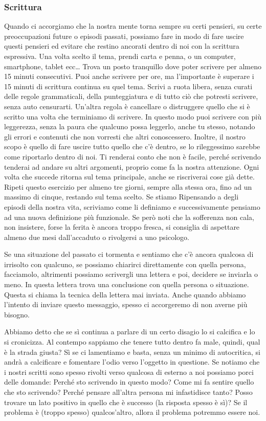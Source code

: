 \documentclass[12pt]{book} %
\begin{document}
\subsubsection{Scrittura}
Quando ci accorgiamo che la nostra mente torna sempre su certi pensieri, su certe preoccupazioni future o episodi
passati, possiamo fare in modo di fare uscire questi pensieri ed evitare che restino ancorati dentro di noi con la
scrittura espressiva. Una volta scelto il tema, prendi carta e penna, o un
computer, smartphone, tablet ecc… Trova un posto tranquillo dove poter scrivere per almeno 15 minuti consecutivi.
Puoi anche scrivere per ore, ma l'importante è superare i 15 minuti di scrittura continua su quel
tema. Scrivi a ruota libera, senza curati delle regole grammaticali, della punteggiatura e di tutto ciò che potresti
scrivere, senza auto censurarti. Un'altra regola è cancellare o distruggere quello che si è
scritto una volta che terminiamo di scrivere. In questo modo puoi scrivere con più leggerezza, senza la paura che
qualcuno possa leggerlo, anche tu stesso, notando gli errori e contenuti che non vorresti che altri conoscessero.
Inoltre, il nostro scopo è quello di fare uscire tutto quello che c'è dentro, se lo rileggessimo
sarebbe come riportarlo dentro di noi. Ti renderai conto che non è facile, perché scrivendo tenderai ad andare su altri
argomenti, proprio come fa la nostra attenzione. Ogni volta che succede ritorna sul tema principale, anche se
riscriverai cose già dette. Ripeti questo esercizio per almeno tre giorni, sempre alla stessa ora, fino ad un massimo
di cinque, restando sul tema scelto. 
Se stiamo Ripensando a degli episodi della nostra vita, scriviamo come li definiamo e successivamente pensiamo ad una nuova definizione più funzionale. Se però noti che la sofferenza non cala, non insistere, forse la
ferita è ancora troppo fresca, si consiglia di aspettare almeno due mesi dall'accaduto o rivolgersi a uno psicologo.

Se una situazione del passato ci tormenta e sentiamo che c'è ancora qualcosa di irrisolto con qualcuno, se possiamo
chiarirci direttamente con quella persona, facciamolo, altrimenti possiamo scrivergli una lettera e poi, decidere se
inviarla o meno. In questa lettera trova una conclusione con quella persona o situazione.
Questa si chiama la tecnica della lettera mai inviata. Anche quando abbiamo l'intento di inviare questo messaggio, spesso ci accorgeremo di non averne più bisogno.

Abbiamo detto che se sì continua a parlare di un certo disagio lo si calcifica e lo si cronicizza. Al contempo sappiamo
che tenere tutto dentro fa male, quindi, qual è la strada giusta? Sì se ci lamentiamo e basta, senza un minimo di
autocritica, si andrà a calcificare e fomentare l'odio verso l'oggetto in questione. Se notiamo
che i nostri scritti sono spesso rivolti verso qualcosa di esterno a noi possiamo porci delle domande: Perché sto
scrivendo in questo modo? Come mi fa sentire quello che sto scrivendo? Perché pensare all'altra
persona mi infastidisce tanto? Posso trovare un lato positivo in quello che è successo (la risposta spesso è sì)?
Se il problema è (troppo spesso) qualcos'altro, allora il problema potremmo essere noi.
\end{document}
